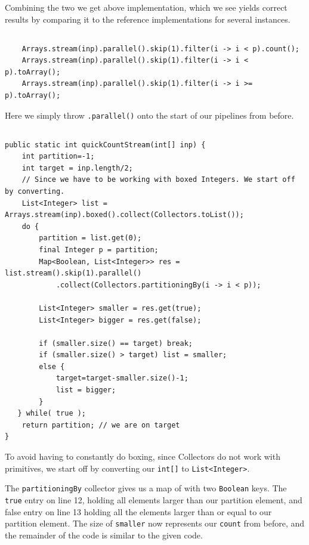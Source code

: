 \documentclass[a5paper]{article}
\begin{document}
Combining the two we get above implementation, which we see yields correct results by comparing it 
to the reference implementations for several instances.

\subsection{}
\begin{lstlisting}
    Arrays.stream(inp).parallel().skip(1).filter(i -> i < p).count();
    Arrays.stream(inp).parallel().skip(1).filter(i -> i < p).toArray();
    Arrays.stream(inp).parallel().skip(1).filter(i -> i >= p).toArray();
\end{lstlisting}
Here we simply throw \texttt{.parallel()} onto the start of our pipelines from before.

\subsection{}

\begin{lstlisting}
public static int quickCountStream(int[] inp) {
    int partition=-1;
    int target = inp.length/2;
    // Since we have to be working with boxed Integers. We start off by converting.
    List<Integer> list = Arrays.stream(inp).boxed().collect(Collectors.toList());
    do {
        partition = list.get(0);
        final Integer p = partition;
        Map<Boolean, List<Integer>> res = list.stream().skip(1).parallel()
            .collect(Collectors.partitioningBy(i -> i < p));

        List<Integer> smaller = res.get(true);
        List<Integer> bigger = res.get(false);

        if (smaller.size() == target) break;
        if (smaller.size() > target) list = smaller;
        else {
            target=target-smaller.size()-1;
            list = bigger;
        }
   } while( true );
    return partition; // we are on target
}
\end{lstlisting}
To avoid having to constantly do boxing, since Collectors do not work with primitives,
we start off by converting our \texttt{int[]} to \texttt{List<Integer>}.

The \texttt{partitioningBy} collector gives us a map of with two \texttt{Boolean} keys.
The \texttt{true} entry on line 12, holding all elements larger than our partition element, and false entry on line 13 holding
all the elements larger than or equal to our partition element. The size of \texttt{smaller} now represents our \texttt{count}
from before, and the remainder of the code is similar to the given code.
\end{document}
